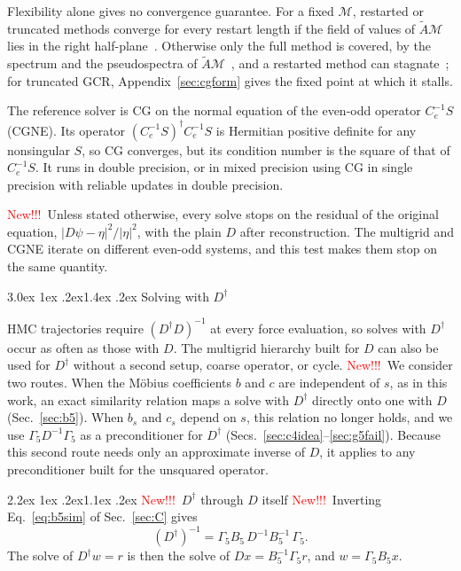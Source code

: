 \documentclass[11pt,a4paper]{article}
\makeatletter
\newif\ifshownew \shownewtrue
\DeclareRobustCommand\New{\ifshownew\textcolor{red}{New!!!}\ \else\ignorespaces\fi}
\renewcommand\section{\@startsection{section}{1}{\z@}%
  {3.0ex \@plus 1ex \@minus .2ex}{1.4ex \@plus .2ex}%
  {\centering\normalfont\normalsize\bfseries}}
\renewcommand\subsection{\@startsection{subsection}{2}{\z@}%
  {2.2ex \@plus 1ex \@minus .2ex}{1.1ex \@plus .2ex}%
  {\centering\normalfont\small\bfseries}}
\newcommand\FloatBarrier{\par\begingroup\let\@elt\relax
  \edef\@tempa{\@botlist\@deferlist\@dbldeferlist}%
  \ifx\@tempa\@empty\else\clearpage\fi\endgroup}
\let\origsection\section
\renewcommand\section{\FloatBarrier\origsection}
\numberwithin{equation}{section}
\newcommand{\dg}{^{\dagger}}
\newcommand{\Gfive}{\Gamma_5}
\newcommand{\Ce}{C_{e}}
\newif\ifresults
\makeatother
\begin{document}
Flexibility alone gives no convergence guarantee. For a fixed $\mathcal M$, restarted or truncated
methods converge for every restart length if the field of values of $\tilde A\mathcal M$ lies in
the right half-plane~\cite{ESS}. Otherwise only the full method is covered, by the spectrum and
the pseudospectra of $\tilde A\mathcal M$~\cite{NRT,TrefethenEmbree}, and a restarted method can
stagnate~\cite{Embree}; for truncated GCR, Appendix~\ref{sec:cgform} gives the fixed point at which it stalls.

The reference solver is CG on the normal equation of the even-odd operator $\Ce^{-1}S$ (CGNE). Its
operator $(\Ce^{-1}S)\dg\Ce^{-1}S$ is Hermitian positive definite for any nonsingular $S$, so CG
converges, but its condition number is the square of that of $\Ce^{-1}S$. It runs in double
precision, or in mixed precision using CG in single precision with reliable updates in double
precision.\ifresults{} Appendix~\ref{sec:cgform} compares it with CG on $S\dg S$.\fi

\New Unless stated otherwise, every solve stops on the residual of the original equation,
$|D\psi-\eta|^2/|\eta|^2$, with the plain $D$ after reconstruction. The multigrid and CGNE iterate
on different even-odd systems, and this test makes them stop on the same quantity.

\section{Solving with \texorpdfstring{$D\dg$}{D-dagger}}
\label{sec:dagger}

HMC trajectories require $(D\dg D)^{-1}$ at every force evaluation, so solves with $D\dg$ occur as
often as those with $D$. The multigrid hierarchy built for $D$ can also be used for $D\dg$ without
a second setup, coarse operator, or cycle. \New We consider two routes. When the
M\"obius coefficients $b$ and $c$ are independent of $s$, as in this work, an exact similarity
relation maps a solve with $D\dg$ directly onto one with $D$ (Sec.~\ref{sec:b5}). When $b_s$ and
$c_s$ depend on $s$, this relation no longer holds, and we use $\Gfive D^{-1}\Gfive$ as a
preconditioner for $D\dg$ (Secs.~\ref{sec:c4idea}--\ref{sec:g5fail}). Because this second route
needs only an approximate inverse of $D$, it applies to any preconditioner built for the unsquared
operator.

\subsection{\New \texorpdfstring{$D\dg$}{D-dagger} through \texorpdfstring{$D$}{D} itself}
\label{sec:b5}
\New Inverting Eq.~\eqref{eq:b5sim} of Sec.~\ref{sec:C} gives
\begin{equation}
\boxed{\;(D\dg)^{-1}=\Gfive B_5\,D^{-1}B_5^{-1}\,\Gfive .\;}
\label{eq:b5}
\end{equation}
The solve of $D\dg w=r$ is then the solve of $Dx=B_5^{-1}\Gfive r$, and $w=\Gfive B_5x$.
\end{document}
